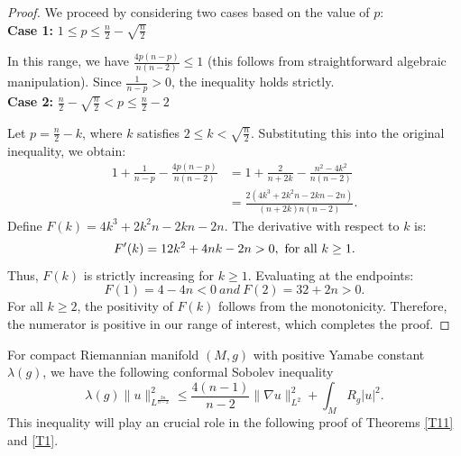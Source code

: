 \documentclass[12pt, twoside]{article}
\theoremstyle{definition}
\numberwithin{equation}{section}
\def \la {\lambda}
\def\na {\nabla}
\begin{document}
\begin{proof}
We proceed by considering two cases based on the value of $p$:\\
\textbf{Case 1:} $1 \leq p \leq \frac{n}{2} - \sqrt{\frac{n}{2}}$

In this range, we have $\frac{4p(n - p)}{n(n - 2)} \leq 1$ (this follows from straightforward algebraic manipulation). Since $\frac{1}{n - p} > 0$, the inequality holds strictly.\\
\textbf{Case 2:} $\frac{n}{2} - \sqrt{\frac{n}{2}} < p \leq \frac{n}{2} - 2$

Let $p = \frac{n}{2} - k$, where $k$ satisfies $2 \leq k < \sqrt{\frac{n}{2}}$. Substituting this into the original inequality, we obtain:
\begin{equation*}
\begin{split}
1+\frac{1}{n-p}-\frac{4p(n-p) }{n(n-2)}&=1+\frac{2}{n+2k}-\frac{n^{2}-4k^{2} }{n(n-2)}\\
&=\frac{2(4k^{3}+2k^{2}n-2kn-2n)}{(n+2k)n(n-2)}.
\end{split}
\end{equation*}
Define $F(k) = 4k^3 + 2k^2n - 2kn - 2n$. The derivative with respect to $k$ is:
$$F'(k)=12k^{2}+4nk-2n>0,\ {\rm{for}\ all}\ k\geq1.$$
Thus, $F(k)$ is strictly increasing for $k \geq 1$. Evaluating at the endpoints:
$$F(1) = 4 - 4n < 0\  and\ F(2) = 32 + 2n> 0.$$
For all $k \geq 2$, the positivity of $F(k)$ follows from the monotonicity. Therefore, the numerator is positive in our range of interest, which completes the proof.	
\end{proof}
For compact Riemannian manifold $(M,g)$ with positive Yamabe constant $\la(g)$, we have the following conformal  Sobolev inequality
\begin{equation}\label{confSobo}
\la(g)\|u\|^{2}_{L^{\frac{2n}{n-2} } }\leq\frac{4(n-1)}{n-2}\|\na u\|^{2}_{L^{2}}+\int_{M}R_{g}|u|^{2}.
\end{equation}
This inequality will play an crucial role in the following proof of Theorems \ref{T11} and \ref{T1}.
\end{document}
